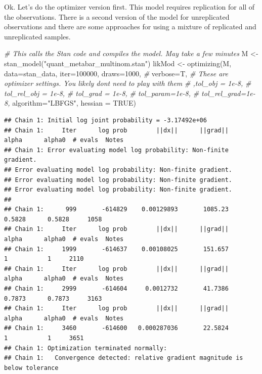 \documentclass[
]{article}
\newenvironment{Shaded}{\begin{snugshade}}{\end{snugshade}}
\newcommand{\AttributeTok}[1]{\textcolor[rgb]{0.77,0.63,0.00}{#1}}
\newcommand{\CommentTok}[1]{\textcolor[rgb]{0.56,0.35,0.01}{\textit{#1}}}
\newcommand{\ConstantTok}[1]{\textcolor[rgb]{0.00,0.00,0.00}{#1}}
\newcommand{\DecValTok}[1]{\textcolor[rgb]{0.00,0.00,0.81}{#1}}
\newcommand{\FunctionTok}[1]{\textcolor[rgb]{0.00,0.00,0.00}{#1}}
\newcommand{\NormalTok}[1]{#1}
\newcommand{\OtherTok}[1]{\textcolor[rgb]{0.56,0.35,0.01}{#1}}
\newcommand{\StringTok}[1]{\textcolor[rgb]{0.31,0.60,0.02}{#1}}
\begin{document}
Ok. Let's do the optimizer version first. This model requires
replication for all of the observations. There is a second version of
the model for unreplicated observations and there are some approaches
for using a mixture of replicated and unreplicated samples.

\begin{Shaded}
\begin{Highlighting}[]
  \CommentTok{\# This calls the Stan code and compiles the model.  May take a few minutes}
\NormalTok{ M }\OtherTok{\textless{}{-}} \FunctionTok{stan\_model}\NormalTok{(}\StringTok{"quant\_metabar\_multinom.stan"}\NormalTok{)}
\NormalTok{ likMod }\OtherTok{\textless{}{-}} \FunctionTok{optimizing}\NormalTok{(M, }\AttributeTok{data=}\NormalTok{stan\_data, }\AttributeTok{iter=}\DecValTok{100000}\NormalTok{,}
                      \AttributeTok{draws=}\DecValTok{1000}\NormalTok{, }\CommentTok{\# }
                      \AttributeTok{verbose=}\NormalTok{T,}
\CommentTok{\# These are optimizer settings.  You likely don\textquotesingle{}t need to play with them}
                      \CommentTok{\# ,tol\_obj = 1e{-}8,}
                      \CommentTok{\# tol\_rel\_obj = 1e{-}8,}
                      \CommentTok{\# tol\_grad = 1e{-}8,}
                      \CommentTok{\# tol\_param=1e{-}8,}
                      \CommentTok{\# tol\_rel\_grad=1e{-}8,}
                      \AttributeTok{algorithm=}\StringTok{"LBFGS"}\NormalTok{,}
                      \AttributeTok{hessian =} \ConstantTok{TRUE}\NormalTok{)}
\end{Highlighting}
\end{Shaded}

\begin{verbatim}
## Chain 1: Initial log joint probability = -3.17492e+06
## Chain 1:     Iter      log prob        ||dx||      ||grad||       alpha      alpha0  # evals  Notes 
## Chain 1: Error evaluating model log probability: Non-finite gradient.
## Error evaluating model log probability: Non-finite gradient.
## Error evaluating model log probability: Non-finite gradient.
## Error evaluating model log probability: Non-finite gradient.
## 
## Chain 1:      999       -614829    0.00129893       1085.23      0.5828      0.5828     1058   
## Chain 1:     Iter      log prob        ||dx||      ||grad||       alpha      alpha0  # evals  Notes 
## Chain 1:     1999       -614637    0.00108025       151.657           1           1     2110   
## Chain 1:     Iter      log prob        ||dx||      ||grad||       alpha      alpha0  # evals  Notes 
## Chain 1:     2999       -614604     0.0012732       41.7386      0.7873      0.7873     3163   
## Chain 1:     Iter      log prob        ||dx||      ||grad||       alpha      alpha0  # evals  Notes 
## Chain 1:     3460       -614600   0.000287036       22.5824           1           1     3651   
## Chain 1: Optimization terminated normally: 
## Chain 1:   Convergence detected: relative gradient magnitude is below tolerance
\end{verbatim}
\end{document}
